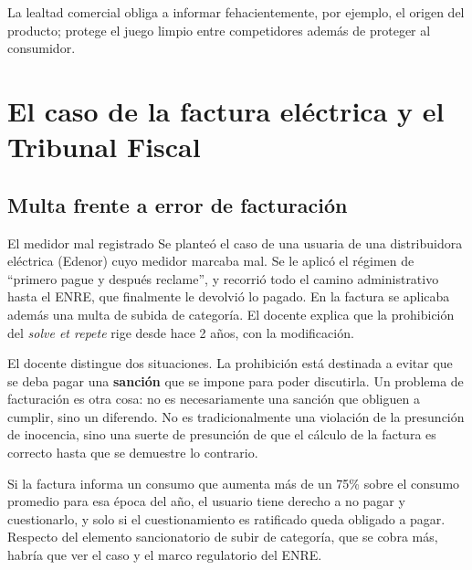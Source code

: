 \documentclass[12pt,oneside]{book}
\begin{document}
\begin{important}
La lealtad comercial obliga a informar fehacientemente, por ejemplo, el origen del producto; protege el juego limpio entre competidores además de proteger al consumidor.
\end{important}

\section{El caso de la factura eléctrica y el Tribunal Fiscal}

\subsection{Multa frente a error de facturación}

\begin{example}{El medidor mal registrado}
Se planteó el caso de una usuaria de una distribuidora eléctrica (Edenor) cuyo medidor marcaba mal. Se le aplicó el régimen de ``primero pague y después reclame'', y recorrió todo el camino administrativo hasta el ENRE, que finalmente le devolvió lo pagado. En la factura se aplicaba además una multa de subida de categoría. El docente explica que la prohibición del \textit{solve et repete} rige desde hace 2 años, con la modificación.
\end{example}

El docente distingue dos situaciones. La prohibición está destinada a evitar que se deba pagar una \textbf{sanción} que se impone para poder discutirla. Un problema de facturación es otra cosa: no es necesariamente una sanción que obliguen a cumplir, sino un diferendo. No es tradicionalmente una violación de la presunción de inocencia, sino una suerte de presunción de que el cálculo de la factura es correcto hasta que se demuestre lo contrario.

Si la factura informa un consumo que aumenta más de un 75\% sobre el consumo promedio para esa época del año, el usuario tiene derecho a no pagar y cuestionarlo, y solo si el cuestionamiento es ratificado queda obligado a pagar. Respecto del elemento sancionatorio de subir de categoría, que se cobra más, habría que ver el caso y el marco regulatorio del ENRE.

\end{document}
